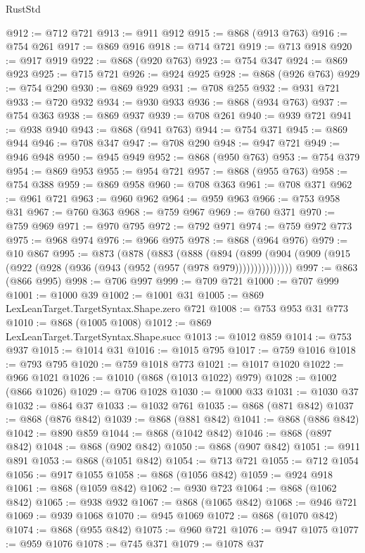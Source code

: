 \begin{lexlean}{RustStd}
\begin{coremodule}
@912 := @712 @721
@913 := @911 @912
@915 := @868 (@913 @763)
@916 := @754 @261
@917 := @869 @916
@918 := @714 @721
@919 := @713 @918
@920 := @917 @919
@922 := @868 (@920 @763)
@923 := @754 @347
@924 := @869 @923
@925 := @715 @721
@926 := @924 @925
@928 := @868 (@926 @763)
@929 := @754 @290
@930 := @869 @929
@931 := @708 @255
@932 := @931 @721
@933 := @720 @932
@934 := @930 @933
@936 := @868 (@934 @763)
@937 := @754 @363
@938 := @869 @937
@939 := @708 @261
@940 := @939 @721
@941 := @938 @940
@943 := @868 (@941 @763)
@944 := @754 @371
@945 := @869 @944
@946 := @708 @347
@947 := @708 @290
@948 := @947 @721
@949 := @946 @948
@950 := @945 @949
@952 := @868 (@950 @763)
@953 := @754 @379
@954 := @869 @953
@955 := @954 @721
@957 := @868 (@955 @763)
@958 := @754 @388
@959 := @869 @958
@960 := @708 @363
@961 := @708 @371
@962 := @961 @721
@963 := @960 @962
@964 := @959 @963
@966 := @753 @958 @31
@967 := @760 @363
@968 := @759 @967
@969 := @760 @371
@970 := @759 @969
@971 := @970 @795
@972 := @792 @971
@974 := @759 @972 @773
@975 := @968 @974
@976 := @966 @975
@978 := @868 (@964 @976)
@979 := @10 @867
@995 := @873
    (@878
      (@883
        (@888
          (@894
            (@899 (@904 (@909 (@915 (@922 (@928 (@936 (@943 (@952 (@957 (@978 @979)))))))))))))))
@997 := @863 (@866 @995)
@998 := @706 @997
@999 := @709 @721
@1000 := @707 @999
@1001 := @1000 @39
@1002 := @1001 @31
@1005 := @869 LexLeanTarget.TargetSyntax.Shape.zero @721
@1008 := @753 @953 @31 @773
@1010 := @868 (@1005 @1008)
@1012 := @869 LexLeanTarget.TargetSyntax.Shape.succ
@1013 := @1012 @859
@1014 := @753 @937
@1015 := @1014 @31
@1016 := @1015 @795
@1017 := @759 @1016
@1018 := @793 @795
@1020 := @759 @1018 @773
@1021 := @1017 @1020
@1022 := @966 @1021
@1026 := @1010 (@868 (@1013 @1022) @979)
@1028 := @1002 (@866 @1026)
@1029 := @706 @1028
@1030 := @1000 @33
@1031 := @1030 @37
@1032 := @864 @37
@1033 := @1032 @761
@1035 := @868 (@871 @842)
@1037 := @868 (@876 @842)
@1039 := @868 (@881 @842)
@1041 := @868 (@886 @842)
@1042 := @890 @859
@1044 := @868 (@1042 @842)
@1046 := @868 (@897 @842)
@1048 := @868 (@902 @842)
@1050 := @868 (@907 @842)
@1051 := @911 @891
@1053 := @868 (@1051 @842)
@1054 := @713 @721
@1055 := @712 @1054
@1056 := @917 @1055
@1058 := @868 (@1056 @842)
@1059 := @924 @918
@1061 := @868 (@1059 @842)
@1062 := @930 @723
@1064 := @868 (@1062 @842)
@1065 := @938 @932
@1067 := @868 (@1065 @842)
@1068 := @946 @721
@1069 := @939 @1068
@1070 := @945 @1069
@1072 := @868 (@1070 @842)
@1074 := @868 (@955 @842)
@1075 := @960 @721
@1076 := @947 @1075
@1077 := @959 @1076
@1078 := @745 @371
@1079 := @1078 @37

\end{coremodule}
\end{lexlean}
